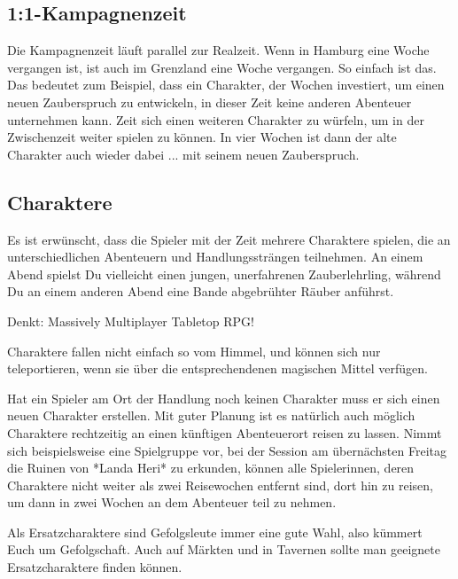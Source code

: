 \documentclass[11pt]{wbzine}
\begin{document}
\begin{multicols}{2}
    \subsection{1:1-Kampagnenzeit}

    Die Kampagnenzeit läuft parallel zur Realzeit. Wenn in Hamburg
    eine Woche vergangen ist, ist auch im Grenzland eine Woche
    vergangen. So einfach ist das. Das bedeutet zum Beispiel, dass
    ein Charakter, der Wochen investiert, um einen neuen
    Zauberspruch zu entwickeln, in dieser Zeit keine anderen
    Abenteuer unternehmen kann. Zeit sich einen weiteren Charakter
    zu würfeln, um in der Zwischenzeit weiter spielen zu können. In
    vier Wochen ist dann der alte Charakter auch wieder dabei ...
    mit seinem neuen Zauberspruch.

    \subsection{Charaktere}

    Es ist erwünscht, dass die Spieler mit der Zeit mehrere
    Charaktere spielen, die an unterschiedlichen Abenteuern und
    Handlungssträngen teilnehmen. An einem Abend spielst Du
    vielleicht einen jungen, unerfahrenen Zauberlehrling, während Du
    an einem anderen Abend eine Bande abgebrühter Räuber anführst.

    \begin{tcolorbox} 
         Denkt: Massively Multiplayer Tabletop RPG!  
    \end{tcolorbox}

    Charaktere fallen nicht einfach so vom Himmel, und können sich
    nur teleportieren, wenn sie über die entsprechendenen magischen
    Mittel verfügen.

    Hat ein Spieler am Ort der Handlung noch keinen Charakter muss
    er sich einen neuen Charakter erstellen. Mit guter Planung ist
    es natürlich auch möglich Charaktere rechtzeitig an einen
    künftigen Abenteuerort reisen zu lassen. Nimmt sich
    beispielsweise eine Spielgruppe vor, bei der Session am
    übernächsten Freitag die Ruinen von *Landa Heri* zu erkunden,
    können alle Spielerinnen, deren Charaktere nicht weiter als zwei
    Reisewochen entfernt sind, dort hin zu reisen, um dann in zwei
    Wochen an dem Abenteuer teil zu nehmen.

    Als Ersatzcharaktere sind Gefolgsleute immer eine gute Wahl,
    also kümmert Euch um Gefolgschaft. Auch auf Märkten und in
    Tavernen sollte man geeignete Ersatzcharaktere finden können.


\end{multicols}
\end{document}
